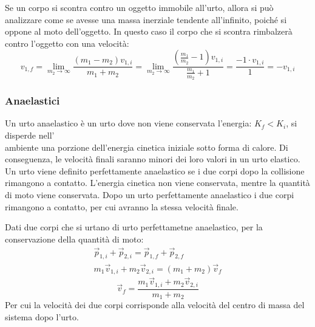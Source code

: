 \documentclass{article}
\numberwithin{equation}{subsection}
\begin{document}
Se un corpo si scontra contro un oggetto immobile all'urto, 
allora si può analizzare come se avesse una massa inerziale 
tendente all'infinito, poiché si oppone al moto dell'oggetto. 
In questo caso il corpo che si scontra rimbalzerà contro l'oggetto 
con una velocità:
\begin{equation}
    v_{1,f}=\displaystyle\lim_{m_2\to\infty}\frac{(m_1-m_2)v_{1,i}}{m_1+m_2}=\lim_{m_2\to\infty}\frac{\left(\frac{m_1}{m_2}-1\right)v_{1,i}}{\frac{m_1}{m_2}+1}=\frac{-1\cdot v_{1,i}}{1}=-v_{1,i}
\end{equation}

\subsubsection{Anaelastici}


Un urto anaelastico è un urto dove non viene conservata 
l'energia: $K_f<K_i$, si disperde nell'\\ambiente una porzione 
dell'energia cinetica iniziale sotto forma di calore. Di conseguenza, le velocità 
finali saranno minori dei loro valori in un urto elastico. 
\\
Un urto viene definito perfettamente anaelastico se i due corpi dopo la collisione rimangono a contatto. L'energia cinetica non viene conservata, 
mentre la quantità di moto viene conservata. Dopo un urto perfettamente anaelastico i due corpi rimangono a contatto, per cui avranno la stessa velocità finale. 


Dati due corpi che si urtano di urto perfettametne anaelastico, per la conservazione della quantità di moto:
\begin{gather*}
    \vec{p}_{1,i}+\vec{p}_{2,i}=\vec{p}_{1,f}+\vec{p}_{2,f}\\
    m_1\vec{v}_{1,i}+m_2\vec{v}_{2,i}=(m_1+m_2)\vec{v}_f
\end{gather*}
\begin{equation}
    \vec{v}_f=\displaystyle\frac{m_1\vec{v}_{1,i}+m_2\vec{v}_{2,i}}{m_1+m_2}
\end{equation}
Per cui la velocità dei due corpi corrisponde 
alla velocità del centro di massa del sistema dopo l'urto. 
\end{document}
